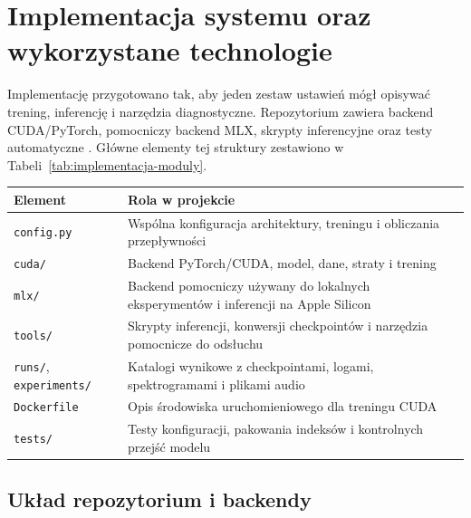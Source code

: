 \section{Implementacja systemu oraz wykorzystane technologie}
\label{sec:implementacja-technologie}

Implementację przygotowano tak, aby jeden zestaw ustawień mógł opisywać trening, inferencję i narzędzia diagnostyczne. Repozytorium zawiera backend CUDA/PyTorch, pomocniczy backend MLX, skrypty inferencyjne oraz testy automatyczne \cite{Nvidia2026Cuda,Paszke2019PyTorch,Apple2026MLX}. Główne elementy tej struktury zestawiono w Tabeli~\ref{tab:implementacja-moduly}.

\begin{center}
\centering
\small
\begin{tabular}{>{\raggedright\arraybackslash}p{} >{\raggedright\arraybackslash}p{}}
\toprule
Element & Rola w projekcie \\
\midrule
\texttt{config.py} & Wspólna konfiguracja architektury, treningu i obliczania przepływności \\
\texttt{cuda/} & Backend PyTorch/CUDA, model, dane, straty i trening \\
\texttt{mlx/} & Backend pomocniczy używany do lokalnych eksperymentów i inferencji na Apple Silicon \\
\texttt{tools/} & Skrypty inferencji, konwersji checkpointów i narzędzia pomocnicze do odsłuchu \\
\texttt{runs/}, \texttt{experiments/} & Katalogi wynikowe z checkpointami, logami, spektrogramami i plikami audio \\
\texttt{Dockerfile} & Opis środowiska uruchomieniowego dla treningu CUDA \\
\texttt{tests/} & Testy konfiguracji, pakowania indeksów i kontrolnych przejść modelu \\
\bottomrule
\end{tabular}
\label{tab:implementacja-moduly}
\end{center}

\subsection{Układ repozytorium i backendy}

